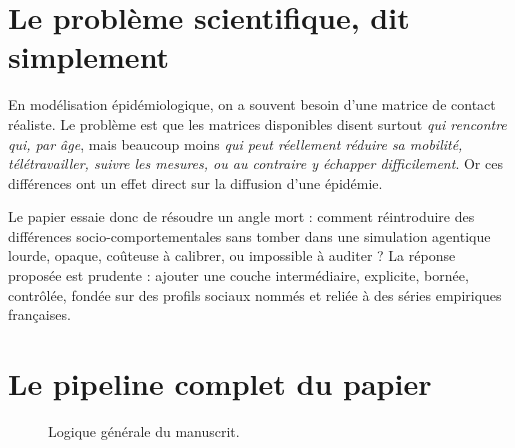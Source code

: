 \documentclass[11pt,a4paper]{article}
\begin{document}
\section{Le problème scientifique, dit simplement}

En modélisation épidémiologique, on a souvent besoin d'une matrice de contact réaliste. Le problème est que les matrices disponibles disent surtout \emph{qui rencontre qui, par âge}, mais beaucoup moins \emph{qui peut réellement réduire sa mobilité, télétravailler, suivre les mesures, ou au contraire y échapper difficilement}. Or ces différences ont un effet direct sur la diffusion d'une épidémie.

Le papier essaie donc de résoudre un angle mort : comment réintroduire des différences socio-comportementales sans tomber dans une simulation agentique lourde, opaque, coûteuse à calibrer, ou impossible à auditer ? La réponse proposée est prudente : ajouter une couche intermédiaire, explicite, bornée, contrôlée, fondée sur des profils sociaux nommés et reliée à des séries empiriques françaises.

\section{Le pipeline complet du papier}

\begin{figure}[h!]
\centering
{}
\caption{Logique générale du manuscrit.}
\end{figure}
\end{document}
